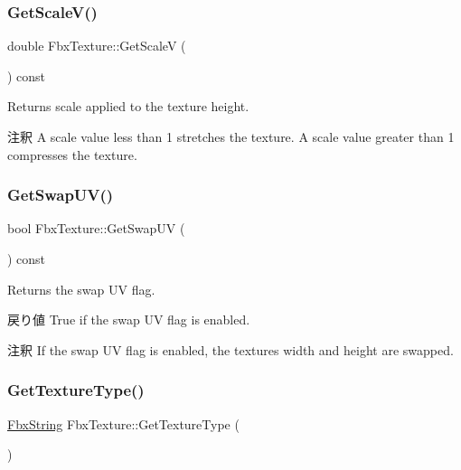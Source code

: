 \subsubsection{\texorpdfstring{Get\+Scale\+V()}{GetScaleV()}}
{\footnotesize\ttfamily double Fbx\+Texture\+::\+Get\+ScaleV (\begin{DoxyParamCaption}{ }\end{DoxyParamCaption}) const}

Returns scale applied to the texture height. \begin{DoxyRemark}{注釈}
A scale value less than 1 stretches the texture. A scale value greater than 1 compresses the texture. 
\end{DoxyRemark}
\mbox{\label{class_fbx_texture_ac73ac8fda4d8e4e31c829ffb6838fcad}} 
\subsubsection{\texorpdfstring{Get\+Swap\+U\+V()}{GetSwapUV()}}
{\footnotesize\ttfamily bool Fbx\+Texture\+::\+Get\+Swap\+UV (\begin{DoxyParamCaption}{ }\end{DoxyParamCaption}) const}

Returns the swap UV flag. \begin{DoxyReturn}{戻り値}
{\ttfamily True} if the swap UV flag is enabled. 
\end{DoxyReturn}
\begin{DoxyRemark}{注釈}
If the swap UV flag is enabled, the texture\textquotesingle{}s width and height are swapped. 
\end{DoxyRemark}
\mbox{\label{class_fbx_texture_ae671b7102a419f20687774bafee8058e}} 
\subsubsection{\texorpdfstring{Get\+Texture\+Type()}{GetTextureType()}}
{\footnotesize\ttfamily \hyperlink{class_fbx_string}{Fbx\+String} Fbx\+Texture\+::\+Get\+Texture\+Type (\begin{DoxyParamCaption}{ }\end{DoxyParamCaption})}

